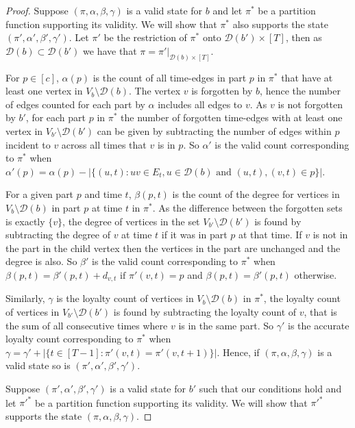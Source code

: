 \documentclass[runningheads]{llncs}
\begin{document}
\begin{proof}
    
    Suppose $(\pi,\alpha,\beta,\gamma)$ is a valid state for $b$ and let $\pi^*$ be a partition function supporting its validity.
    We will show that $\pi^*$ also supports the state $(\pi',\alpha',\beta',\gamma')$.
    Let $\pi'$ be the restriction of $\pi^*$ onto $\mathcal{D}(b')\times [T]$, then as $\mathcal{D}(b) \subset \mathcal{D}(b')$ we have that $\pi=\pi'| _{\mathcal{D}(b)\times [T]}$.

    For $p \in [c]$, $\alpha(p)$ is the count of all time-edges in part $p$ in $\pi^*$ that have at least one vertex in $V_b\setminus \mathcal{D}(b)$.
    The vertex $v$ is forgotten by $b$, hence the number of edges counted for each part by $\alpha$ includes all edges to $v$. 
    As $v$ is not forgotten by $b'$, for each part $p$ in $\pi^*$ the number of forgotten time-edges with at least one vertex in $V_{b'} \setminus \mathcal{D}(b')$ can be given by subtracting the number of edges within $p$ incident to $v$ across all times that $v$ is in $p$. So $\alpha'$ is the valid count corresponding to $\pi^*$ when $\alpha'(p) =\alpha(p) -|\{(u,t):uv \in E_t, u \in \mathcal{D}(b) \text{ and } (u,t),(v,t) \in p \}|$.
    
    For a given part $p$ and time $t$, $\beta(p,t)$ is the count of the degree for vertices in $V_b\setminus \mathcal{D}(b)$ in part $p$ at time $t$ in $\pi^*$. As the difference between the forgotten sets is exactly $\{v\}$, the degree of vertices in the set $V_{b'}\setminus \mathcal{D}(b')$ is found by subtracting the degree of $v$ at time $t$ if it was in part $p$ at that time. If $v$ is not in the part in the child vertex then the vertices in the part are unchanged and the degree is also. So $\beta'$ is the valid count corresponding to $\pi^*$ when $\beta(p,t) = \beta'(p,t) + d_{v,t} \text{ if } \pi'(v,t)=p$ and $\beta(p,t)=\beta'(p,t)$ otherwise.
    
    Similarly, $\gamma$ is the loyalty count of vertices in $V_b\setminus \mathcal{D}(b)$ in $\pi^*$, the loyalty count of vertices in $V_{b'}\setminus \mathcal{D}(b')$ is found by subtracting the loyalty count of $v$, that is the sum of all consecutive times where $v$ is in the same part. So $\gamma'$ is the accurate loyalty count corresponding to $\pi^*$ when $\gamma = \gamma' + |\{t \in [T-1]:\pi'(v,t)=\pi'(v,t+1)\}|$.
    Hence, if $(\pi,\alpha,\beta,\gamma)$ is a valid state so is $(\pi',\alpha',\beta',\gamma')$.


Suppose $(\pi',\alpha',\beta',\gamma')$ is a valid state for $b'$ such that our conditions hold and let $\pi'^*$ be a partition function supporting its validity.
We will show that $\pi'^*$ supports the state $(\pi,\alpha,\beta,\gamma)$.


\end{proof}
\end{document}
